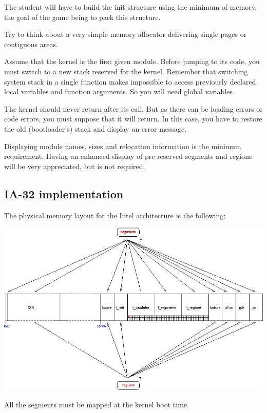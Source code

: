 The student will have to build the init structure using the minimum
of memory, the goal of the game being to pack this structure.

Try to  think about a  very simple memory allocator  delivering single
pages or contiguous areas.

Assume that  the kernel is the  first given module.  Before jumping to
its  code,  you   must  switch  to  a  new   stack  reserved  for  the
kernel.  Remember that  switching system  stack in  a  single function
makes  impossible to  access previously  declared local  variables and
function arguments. So you will need global variables.

The kernel  should never return  after its call.  But as there  can be
loading  errors  or  code  errors,  you  must  suppose  that  it  will
return. In this case, you have to restore the old (bootloader's) stack
and display an error message.

Displaying  module  names, sizes  and  relocation  information is  the
minimum  requirement.   Having  an  enhanced display  of  pre-reserved
segments and regions will be very appreciated, but is not required.

%
%

\subsection{IA-32 implementation}

The physical memory layout for the Intel architecture is the following:

\centerline{\includegraphics[scale=0.5]{figures/k1-memory-layout.jpg}}

All the segments must be mapped at the kernel boot time.

